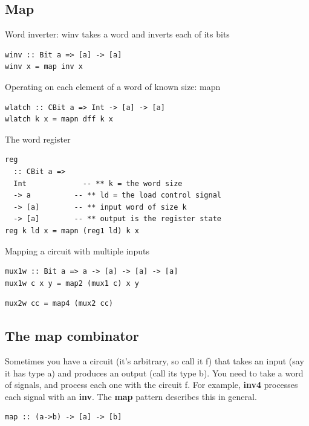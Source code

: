 \documentclass[]{svmono}
\begin{document}
\subsection*{Map}
\label{sec:org0cead25}

Word inverter: winv takes a word and inverts each of its bits


\begin{verbatim}
winv :: Bit a => [a] -> [a]
winv x = map inv x
\end{verbatim}


Operating on each element of a word of known size: mapn


\begin{verbatim}
wlatch :: CBit a => Int -> [a] -> [a]
wlatch k x = mapn dff k x
\end{verbatim}


The word register


\begin{verbatim}
reg
  :: CBit a =>
  Int             -- ** k = the word size
  -> a          -- ** ld = the load control signal
  -> [a]        -- ** input word of size k
  -> [a]        -- ** output is the register state
reg k ld x = mapn (reg1 ld) k x
\end{verbatim}


Mapping a circuit with multiple inputs


\begin{verbatim}
mux1w :: Bit a => a -> [a] -> [a] -> [a]
mux1w c x y = map2 (mux1 c) x y
\end{verbatim}



\begin{verbatim}
mux2w cc = map4 (mux2 cc)
\end{verbatim}
\subsection*{The map combinator}
\label{sec:org93c1cd5}

Sometimes you have a circuit (it's arbitrary, so call it f) that takes
an input (say it has type a) and produces an output (call its type
b).  You need to take a word of signals, and process each one with
the circuit f.  For example, \textbf{inv4} processes each signal with an
\textbf{inv}.  The \textbf{map} pattern describes this in general.



\begin{verbatim}
map :: (a->b) -> [a] -> [b]
\end{verbatim}
\end{document}

